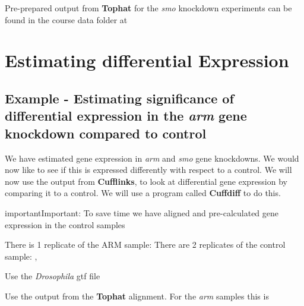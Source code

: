 \documentclass[a4paper,11pt,english]{sphinxmanual}
\begin{document}
Pre-prepared output from \textbf{Tophat} for the \emph{smo} knockdown experiments can be found in the course data folder at 


\chapter{Estimating differential Expression}
\label{exercises/STEP4_CUFFLINKS_DE:estimating-differential-expression}

\section{Example - Estimating significance of differential expression in the \emph{arm} gene knockdown compared to control}
\label{exercises/STEP4_CUFFLINKS_DE:example-estimating-significance-of-differential-expression-in-the-arm-gene-knockdown-compared-to-control}
We have estimated gene expression in \emph{arm} and \emph{smo} gene knockdowns. We would now like to see if this is expressed differently with respect to a control. We will now use the output from \textbf{Cufflinks}, to look at differential gene expression by comparing it to a control. We will use a program called \textbf{Cuffdiff} to do this.

\begin{notice}{important}{Important:}
To save time we have aligned and pre-calculated gene expression in the control samples
\end{notice}

There is 1 replicate of the ARM sample: 
There are 2 replicates of the control sample: , 

Use the \emph{Drosophila} gtf file 

Use the  output from the \textbf{Tophat} alignment. For the \emph{arm} samples this is 
\end{document}
